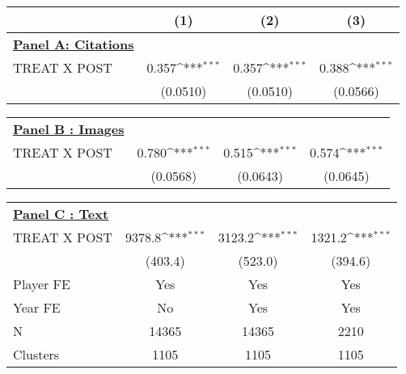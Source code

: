 {
\def\sym#1{\ifmmode^{#1}\else\(^{#1}\)\fi}
\begin{tabular*}{\hsize}{@{\hskip\tabcolsep\extracolsep\fill}l*{3}{c}}
\toprule
                         &\multicolumn{1}{c}{(1)}         &\multicolumn{1}{c}{(2)}         &\multicolumn{1}{c}{(3)}         \\
\midrule \vspace{5mm} \underline{\textbf{Panel A: Citations }}\\
TREAT X POST             &       0.357\sym{***}&       0.357\sym{***}&       0.388\sym{***}\\
                         &    (0.0510)         &    (0.0510)         &    (0.0566)         \\

\end{tabular*} }
{
\def\sym#1{\ifmmode^{#1}\else\(^{#1}\)\fi}
\begin{tabular*}{\hsize}{@{\hskip\tabcolsep\extracolsep\fill}l*{3}{c}}
\midrule \vspace{5mm} \underline{\textbf{Panel B : Images}}\\
TREAT X POST&       0.780\sym{***}&       0.515\sym{***}&       0.574\sym{***}\\
            &    (0.0568)         &    (0.0643)         &    (0.0645)         \\

\end{tabular*} }
{
\def\sym#1{\ifmmode^{#1}\else\(^{#1}\)\fi}
\begin{tabular*}{\hsize}{@{\hskip\tabcolsep\extracolsep\fill}l*{3}{c}}
\midrule \vspace{5mm} \underline{\textbf{Panel C : Text}}\\
TREAT X POST&      9378.8\sym{***}&      3123.2\sym{***}&      1321.2\sym{***}\\
            &     (403.4)         &     (523.0)         &     (394.6)         \\
\midrule
Player FE   &         Yes         &         Yes         &         Yes         \\
Year FE     &          No         &         Yes         &         Yes         \\
N           &       14365         &       14365         &        2210         \\
Clusters    &        1105         &        1105         &        1105         \\
\bottomrule
\end{tabular*}
}
